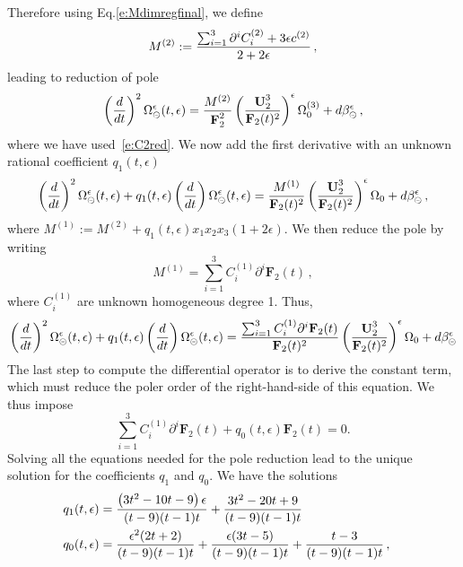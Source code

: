 \documentclass[a4paper,12pt]{article}
\numberwithin{equation}{section}
\numberwithin{figure}{section}
\def\su{\circleddash}
\begin{document}
%
Therefore using Eq.\eqref{e:Mdimregfinal}, we define
\begin{equation}
  \label{e:M2}
  M^{(2)}:={\sum_{i=1}^3 \partial^i  C_i^{(2)}+3\epsilon
    c^{(2)}\over 2+2\epsilon} \,, 
\end{equation}
leading to reduction of pole
\begin{equation}
 \left(d\over dt\right)^2
  \Omega_{\su}^{\epsilon}(t,\epsilon)=
{M^{(2)}\over
     \textbf{F}_2^{2}}\left(\textbf{U}_2^3\over \textbf{F}_2(t)^2\right)^\epsilon \Omega_0^{(3)}+d\beta_\su^\epsilon \, ,
 \end{equation}
where we have used~\eqref{e:C2red}.
%
We now add the first derivative with an unknown rational coefficient $q_1(t,\epsilon)$
\begin{multline}
 \left(d\over dt\right)^2
  \Omega_{\su}^{\epsilon}(t,\epsilon) +q_1(t,\epsilon) \left(d\over dt\right)
  \Omega_{\su}^{\epsilon}(t,\epsilon) =
{M^{(1)}\over
     \textbf{F}_2(t)^{2}}\left(\textbf{U}_2^3\over \textbf{F}_2(t)^2\right)^\epsilon \Omega_0+d\beta_\su^\epsilon \, , 
 \end{multline}
where $M^{(1)}:=M^{(2)}+q_1(t,\epsilon) x_1x_2x_3(1+2\epsilon)$.
 We then reduce the pole by writing
 \begin{equation}\label{e:M2red}
   M^{(1)}= \sum_{i=1}^3
   C_i^{(1)} \partial^i \textbf{F}_2(t) \,, 
 \end{equation}
 where $ C_i^{(1)}$ are unknown homogeneous degree 1.
Thus,
\begin{equation}
 \left(d\over dt\right)^2
  \Omega_{\su}^{\epsilon}(t,\epsilon) +q_1(t,\epsilon) \left(d\over dt\right)
  \Omega_{\su}^{\epsilon}(t,\epsilon) =
{ \sum_{i=1}^3
   C_i^{(1)} \partial^i \textbf{F}_2(t)\over
     \textbf{F}_2(t)^{2}}\left(\textbf{U}_2^3\over \textbf{F}_2(t)^2\right)^\epsilon \Omega_0+d\beta_\su^\epsilon
 \end{equation}
%
The last step to compute the differential operator is to derive the constant term, which must reduce the poler order of the right-hand-side of this equation. We thus impose
\begin{equation}\label{e:c0}
  \sum_{i=1}^3C_i^{(1)}\partial^i \textbf{F}_2(t)+ q_0(t,\epsilon) \textbf{F}_2 (t) =0.
\end{equation}
%
Solving all the equations needed for the pole reduction lead
to the unique solution for the coefficients $q_1$ and $q_0$. 
We have the solutions
\begin{align}
  q_1(t,\epsilon)&=\frac{\left(3 t^2-10 t-9\right) \epsilon }{(t-9) (t-1) t}+\frac{3 t^2-20 t+9}{(t-9) (t-1)
   t}\cr
  q_0(t,\epsilon)&=\frac{\epsilon ^2 (2 t+2)}{(t-9) (t-1) t}+\frac{\epsilon  (3 t-5)}{(t-9) (t-1)
   t}+\frac{t-3}{(t-9) (t-1) t} \, ,
\end{align}
\end{document}
